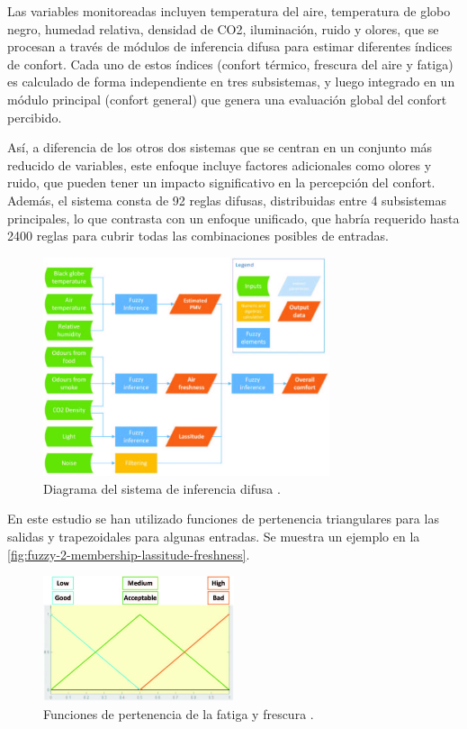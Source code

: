 Las variables monitoreadas incluyen temperatura del aire, temperatura de globo negro, humedad relativa, densidad de CO2, iluminación, ruido y olores, que se procesan a través de módulos de inferencia difusa para estimar diferentes índices de confort. Cada uno de estos índices (confort térmico, frescura del aire y fatiga) es calculado de forma independiente en tres subsistemas, y luego integrado en un módulo principal (confort general) que genera una evaluación global del confort percibido.

Así, a diferencia de los otros dos sistemas que se centran en un conjunto más reducido de variables, este enfoque incluye factores adicionales como olores y ruido, que pueden tener un impacto significativo en la percepción del confort. Además, el sistema consta de 92 reglas difusas, distribuidas entre 4 subsistemas principales, lo que contrasta con un enfoque unificado, que habría requerido hasta 2400 reglas para cubrir todas las combinaciones posibles de entradas.

\begin{figure}[H]
	\centering
	\includegraphics[width=0.75\textwidth]{imgs/fuzzy-inference-system-diagram.JPG}
	\caption{Diagrama del sistema de inferencia difusa \parencite{jablonski2018fuzzy}.}
	\label{fig:fuzzy-inference-system-diagram}
\end{figure}

En este estudio se han utilizado funciones de pertenencia triangulares para las salidas y trapezoidales para algunas entradas. Se muestra un ejemplo en la \autoref{fig:fuzzy-2-membership-lassitude-freshness}. 

\begin{figure}[H]
	\centering
	\includegraphics[width=0.5\textwidth]{imgs/fuzzy-2-membership-lassitude-freshness.JPG}
	\caption{Funciones de pertenencia de la fatiga y frescura \parencite{jablonski2018fuzzy}.}
	\label{fig:fuzzy-2-membership-lassitude-freshness}
\end{figure}


